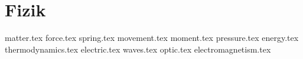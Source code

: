 \chapter{Fizik}
{matter.tex}
\newpage
{force.tex}
\newpage
{spring.tex}
\newpage
{movement.tex}
\newpage
{moment.tex}
\newpage
{pressure.tex}
\newpage
{energy.tex}
\newpage
{thermodynamics.tex}
\newpage
{electric.tex}
\newpage
{waves.tex}
\newpage
{optic.tex}
\newpage
{electromagnetism.tex}
